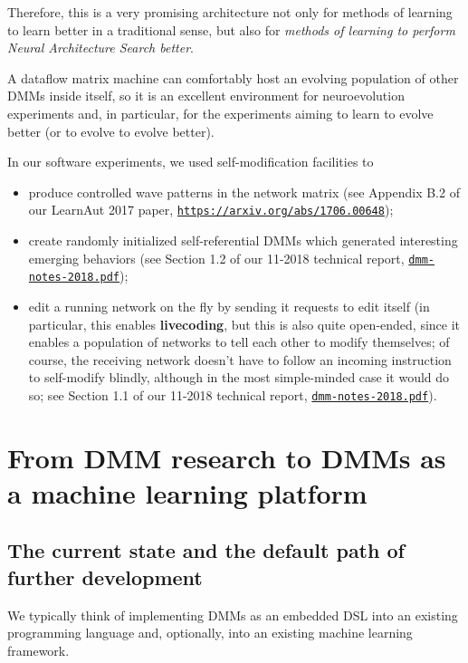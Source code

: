 \documentclass{article}
\begin{document}
Therefore, this is a very promising architecture not only for methods of learning to learn
better in a traditional sense, but also for {\em methods of learning to perform
Neural Architecture Search better}. 

A dataflow matrix machine can comfortably host
an evolving population of other DMMs inside itself, so it is
an excellent environment for neuroevolution experiments and, in particular,
for the experiments aiming to learn to evolve better (or to evolve to evolve better).

\vspace{0.1in}
\noindent
In our software experiments, we used self-modification facilities to

  \begin{itemize}
     \item produce controlled wave patterns in the network matrix (see Appendix B.2 of our LearnAut 2017 paper, \href{https://arxiv.org/abs/1706.00648}{\tt https://arxiv.org/abs/1706.00648});
     \item create randomly initialized self-referential DMMs which generated interesting emerging behaviors (see Section 1.2 of our 11-2018 technical report, \href{https://www.cs.brandeis.edu/~bukatin/dmm-notes-2018.pdf}{\tt dmm-notes-2018.pdf});
     \item edit a running network on the fly by sending it requests to edit itself (in particular, this enables {\bf livecoding}, but this is also quite open-ended, since it enables a population of networks to tell each other to modify themselves; of course, the receiving network doesn't have to follow an incoming instruction to self-modify blindly, although in the most simple-minded case it would do so; see Section 1.1 of our 11-2018 technical report, \href{https://www.cs.brandeis.edu/~bukatin/dmm-notes-2018.pdf}{\tt dmm-notes-2018.pdf}).
  \end{itemize}

\section{From DMM research to DMMs as a machine learning platform}

\subsection{The current state and the default path of further development}

We typically think of implementing DMMs as an embedded DSL into an existing programming language
and, optionally, into an existing machine learning framework. 
\end{document}
